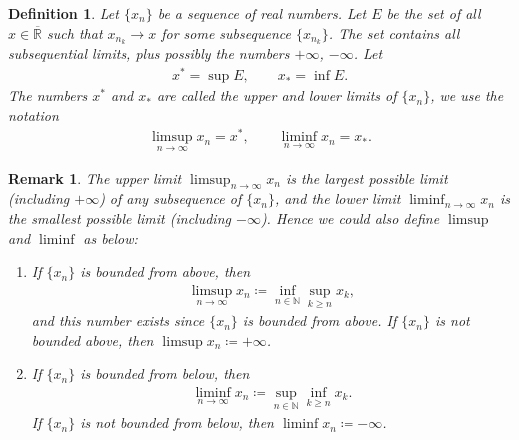 \documentclass[11pt]{book}
\newtheorem{definition}{Definition}[chapter]
\newtheorem{remark}{Remark}[chapter]
\theoremstyle{definition}
\numberwithin{equation}{chapter}
\begin{document}
\begin{definition}\label{def_28}
Let $\{x_n\}$ be a sequence of real numbers. Let $E$ be the set of all $x \in \overline{\mathbb{R}}$ such that $x_{n_k} \to x$ for some subsequence $\{x_{n_k}\}$. The set contains all subsequential limits, plus possibly the numbers $+\infty$, $-\infty$. Let
\begin{align*}
    x^* = \sup E, \qquad x_* = \inf E.
\end{align*}
The numbers $x^*$ and $x_*$ are called the upper and lower limits of $\{x_n\}$, we use the notation
\begin{align*}
    \limsup_{n\to\infty} x_n = x^*, \qquad \liminf_{n\to\infty} x_n = x_*.
\end{align*}
\end{definition}

\begin{remark}
The upper limit $\limsup_{n\to\infty} x_n$ is the largest possible limit (including $+\infty$) of any subsequence of $\{x_n\}$, and the lower limit $\liminf_{n\to\infty} x_n$ is the smallest possible limit (including $-\infty$). Hence we could also define $\limsup$ and $\liminf$ as below:
\begin{enumerate}[label=(\alph*)]
    \item If $\{x_n\}$ is bounded from above, then \begin{align*}
        \limsup_{n\to\infty} x_n \coloneqq \inf_{n \in \mathbb{N}} \sup_{k \geq n} x_k,
    \end{align*}
    and this number exists since $\{x_n\}$ is bounded from above. If $\{x_n\}$ is not bounded above, then $\limsup x_n \coloneqq +\infty$.
    
    \item If $\{x_n\}$ is bounded from below, then \begin{align*}
        \liminf_{n\to\infty} x_n \coloneqq \sup_{n \in \mathbb{N}} \inf_{k \geq n} x_k.
    \end{align*}
    If $\{x_n\}$ is not bounded from below, then $\liminf x_n \coloneqq -\infty$.
\end{enumerate}
\end{remark}

\medskip
\end{document}
